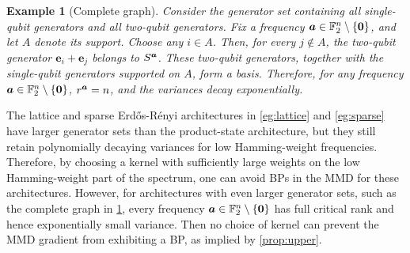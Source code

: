 \documentclass{article}
\theoremstyle{plain}
\newtheorem{example}[theorem]{Example}
\theoremstyle{definition}
\theoremstyle{remark}
\begin{document}
\begin{example}[Complete graph] \label{eg:complete} Consider the generator set containing all single-qubit generators and all two-qubit generators. Fix a frequency ${\bm{a}} \in \mathbb{F}_2^n \setminus \{\bm{0}\}$, and let $A$ denote its support. Choose any $i\in A$. Then, for every $j\notin A$, the two-qubit generator $\bm{e}_i+\bm{e}_j$ belongs to $S^{\bm{a}}$. These two-qubit generators, together with the single-qubit generators supported on $A$, form a basis. Therefore, for any frequency ${\bm{a}} \in \mathbb{F}_2^n \setminus \{\bm{0}\}$, $r^{\bm{a}} =n$, and the variances decay exponentially.
\end{example}

The lattice and sparse Erd\H os-R\'enyi architectures in \cref{eg:lattice} and \cref{eg:sparse} have larger generator sets than the product-state architecture, but they still retain polynomially decaying variances for low Hamming-weight frequencies. Therefore, by choosing a kernel with sufficiently large weights on the low Hamming-weight part of the spectrum, one can avoid BPs in the MMD for these architectures. However, for architectures with even larger generator sets, such as the complete graph in \cref{eg:complete}, every frequency ${\bm{a}} \in \mathbb{F}_2^n \setminus \{\bm{0}\}$ has full critical rank and hence exponentially small variance. Then no choice of kernel can prevent the MMD gradient from exhibiting a BP, as implied by \cref{prop:upper}.

 
\end{document}
